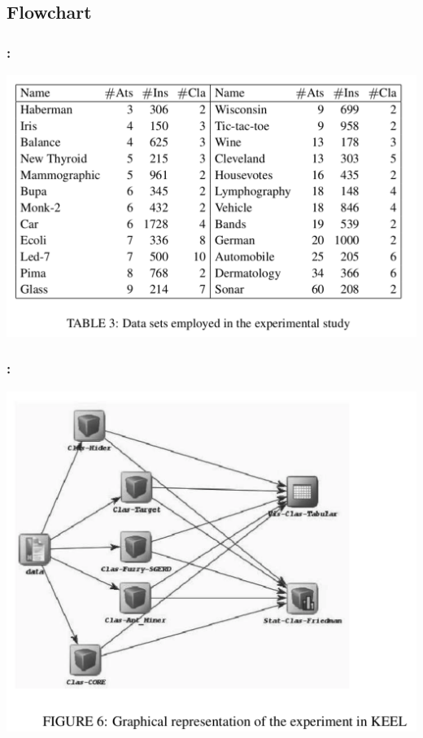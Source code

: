 \documentclass{beamer}
\begin{document}
\begin{CJK*}{UTF8}{bsmi}
\subsection{Flowchart}

\begin{frame}
	\frametitle{\insertsection : \insertsubsection}
	
	\begin{center}
		\includegraphics[height=.65\textheight]{./7.png}
	\end{center}
\end{frame}
\begin{frame}
	\frametitle{\insertsection : \insertsubsection}
	
	\begin{center}
		\includegraphics[height=.65\textheight]{./8.png}
	\end{center}
\end{frame}


\end{CJK*}
\end{document}
